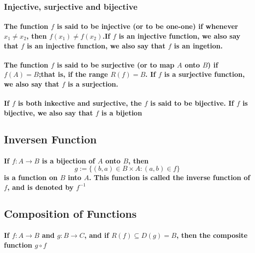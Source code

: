 \documentclass{article}
\begin{document}
            \subsubsection{Injective, surjective and bijective}
            \paragraph{
                The function $f$ is said to be \textbf{injective} (or to be \textbf{one-one}) if whenever $x_1 \neq x_2$, then $f(x_1)\neq f(x_2)$.If $f$ is an injective function, we also say that $f$ is an injective function, we also say that $f$ is an \textbf{ingetion}.
                }
            \paragraph{
                The function $f$ is said to be \textbf{surjective} (or to map $A$ \textbf{onto} $B$) if $f(A)=B$;that is, if the range $R(f)=B$. If $f$ is a surjective function, we also say that $f$ is a \textbf{surjection}.
                }
            \paragraph{
                If $f$ is both inkective and surjective, the $f$ is said to be \textbf{bijective}. If $f$ is bijective, we also say that $f$ is a \textbf{bijetion}
            }

            \subsection{Inversen Function}
            \paragraph{
                If $f:A\rightarrow B$ is a bijection of $A$ onto $B$, then
                $$g:=\{(b,a)\in B\times A :(a,b)\in f\}$$
                is a function on $B$ into $A$. This function is called the \textbf{inverse function} of $f$, and is denoted by $f^{-1}$
            }

            \subsection{Composition of Functions}

            \paragraph{
                If $f:A \rightarrow B$ and $g:B\rightarrow C$, and if $R(f)\subseteq D(g)=B$, then the \textbf{composite function}
                $g\circ f$
            }
\end{document}
